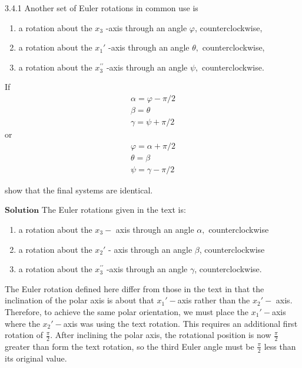 



\begin{mybox}{3.4.1}
Another set of Euler rotations in common use is
\begin{enumerate}[$(a)$]
\item a rotation about the $x_{3}$ -axis through an angle $\varphi$, counterclockwise,
\item a rotation about the $x_{1}'$ -axis through an angle $\theta,$ counterclockwise,
\item a rotation about the $x_{3}^{\prime \prime}$ -axis through an angle $\psi,$ counterclockwise. 
\end{enumerate}
\begin{multicols}{2}
If 
$$
\begin{array}{l}
\alpha=\varphi-\pi / 2 \\
\beta=\theta \\
\gamma=\psi+\pi / 2
\end{array}
$$
or
$$
\begin{array}{l}
\varphi=\alpha+\pi / 2 \\
\theta=\beta \\
\psi=\gamma-\pi / 2
\end{array}
$$
\end{multicols}
show that the final systems are identical.
\end{mybox}

$\boxed{\textbf{Solution}}$ The Euler rotations given in the text is:
\begin{enumerate}
\item a rotation about the $x_{3}-$ axis through an angle $\alpha,$ counterclockwise
\item a rotation about the $x_{2}'$ - axis through an angle $\beta$, counterclockwise
\item a rotation about the $x_{3}^{\prime \prime}$ -axis through an angle $\gamma$, counterclockwise.
\end{enumerate}
The Euler rotation defined here differ from those in the text in that the inclination of the polar axis is about that $x_{1}'-$axis rather than the $x_{2}'-$ axis. Therefore, to achieve the same polar orientation, we must place the $x_{1}'-$axis where the $x_{2}'-$axis was using the text rotation. This requires an additional first rotation of $\frac{\pi}{2}$. After inclining the polar axis, the rotational position
is now $\frac{\pi}{2}$ greater than form the text rotation, so the third Euler angle must be $\frac{\pi}{2}$ less than its original value.

